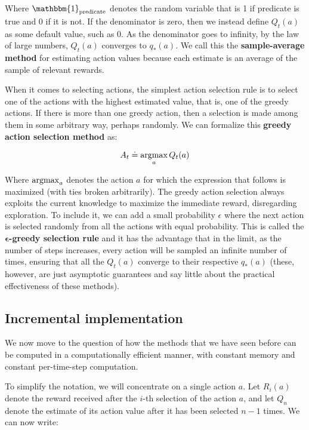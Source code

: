 Where $\mathbbm{1}_{\text{predicate}}$ denotes the random variable that is 1 if predicate is true and 0 if it is not. If the denominator is zero, then we instead define $Q_t(a)$  as some default value, such as 0. As the denominator goes to infinity, by the law of large numbers, $Q_t(a)$ converges to $q_*(a)$. We call this the \textbf{sample-average method} for estimating action values because each estimate is an average of the sample of relevant rewards.

When it comes to selecting actions, the simplest action selection rule is to select one of the actions with the highest estimated value, that is, one of the greedy actions. If there is more than one greedy action, then a selection is made among them in some arbitrary way, perhaps randomly. We can formalize this \textbf{greedy action selection method} as:

\begin{equation}
    A_t \doteq \operatorname*{argmax}_a  Q_t(a)
    \label{eq:ch3-greedyactionselectionmethod}
\end{equation}

Where $\operatorname*{argmax}_a$ denotes the action $a$ for which the expression that follows is maximized (with ties broken arbitrarily). The greedy action selection always exploits the current knowledge to maximize the immediate reward, disregarding exploration. To include it, we can add a small probability $\epsilon$ where the next action is selected randomly from all the actions with equal probability. This is called the \textbf{$\boldsymbol{\epsilon}$-greedy selection rule} and it has the advantage that in the limit, as the number of steps increases, every action will be sampled an infinite number of times, ensuring that all the $Q_t(a)$ converge to their respective $q_*(a)$ (these, however, are just asymptotic guarantees and say little about the practical effectiveness of these methods).

\subsection{Incremental implementation}
We now move to the question of how the methods that we have seen before can be computed in a computationally efficient manner, with constant memory and constant per-time-step computation.

To simplify the notation, we will concentrate on a single action $a$. Let $R_i(a)$ denote the reward received after the $i$-th selection of the action $a$, and let $Q_n$ denote the estimate of its action value after it has been selected $n-1$ times. We can now write:

